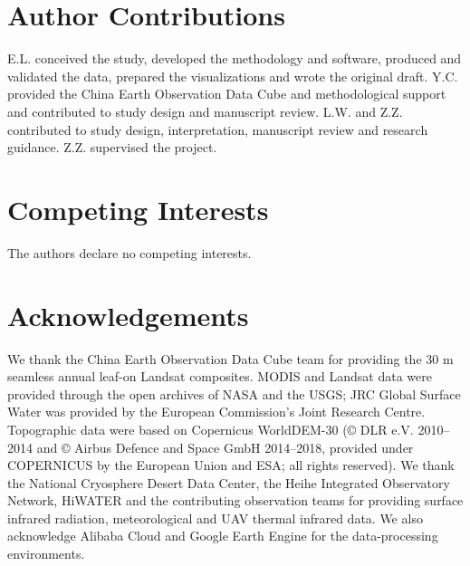 \section*{Author Contributions}
E.L. conceived the study, developed the methodology and software, produced and validated the data, prepared the visualizations and wrote the original draft. Y.C. provided the China Earth Observation Data Cube and methodological support and contributed to study design and manuscript review. L.W. and Z.Z. contributed to study design, interpretation, manuscript review and research guidance. Z.Z. supervised the project.

\section*{Competing Interests}
The authors declare no competing interests.

\section*{Acknowledgements}
We thank the China Earth Observation Data Cube team for providing the 30 m seamless annual leaf-on Landsat composites. MODIS and Landsat data were provided through the open archives of NASA and the USGS; JRC Global Surface Water was provided by the European Commission's Joint Research Centre. Topographic data were based on Copernicus WorldDEM-30 (© DLR e.V. 2010--2014 and © Airbus Defence and Space GmbH 2014--2018, provided under COPERNICUS by the European Union and ESA; all rights reserved). We thank the National Cryosphere Desert Data Center, the Heihe Integrated Observatory Network, HiWATER and the contributing observation teams for providing surface infrared radiation, meteorological and UAV thermal infrared data. We also acknowledge Alibaba Cloud and Google Earth Engine for the data-processing environments.
